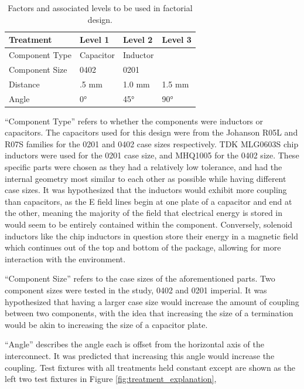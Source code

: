 \documentclass[12pt]{usfcoe}
\begin{document}
    \begin{table}[H]
        \begin{center}
            \begin{tabular}{|l|l|l|l|}
            \hline
            Treatment & Level 1 & Level 2 & Level 3\\
            \hline
            Component Type & Capacitor & Inductor & \\
            \hline
            Component Size & 0402 & 0201 & \\
            \hline
            Distance & .5 mm & 1.0 mm & 1.5 mm\\
            \hline
            Angle & 0° & 45° & 90°\\
            \hline
            \end{tabular}
        	\caption{Factors and associated levels to be used in factorial design.}
        \end{center}
        \label{tbl:treats}
	\end{table}   
	
    ``Component Type'' refers to whether the components were inductors or capacitors.
    The capacitors used for this design were from the Johanson R05L and R07S families for the 0201 and 0402 case sizes respectively.
    TDK MLG0603S chip inductors were used for the 0201 case size, and MHQ1005 for the 0402 size.
    These specific parts were chosen as they had a relatively low tolerance, and had the internal geometry most similar to each other as possible while having different case sizes.
    It was hypothesized that the inductors would exhibit more coupling than capacitors, as the E field lines begin at one plate of a capacitor and end at the other, meaning the majority of the field that electrical energy is stored in would seem to be entirely contained within the component.
    Conversely, solenoid inductors like the chip inductors in question store their energy in a magnetic field which continues out of the top and bottom of the package, allowing for more interaction with the environment. 
    
    ``Component Size'' refers to the case sizes of the aforementioned parts.
    Two component sizes were tested in the study, 0402 and 0201 imperial.
    It was hypothesized that having a larger case size would increase the amount of coupling between two components, with the idea that increasing the size of a termination would be akin to increasing the size of a capacitor plate.
    
    ``Angle'' describes the angle each is offset from the horizontal axis of the interconnect.
    It was predicted that increasing this angle would increase the coupling.
    Test fixtures with all treatments held constant except are shown as the left two test fixtures in Figure \ref{fig:treatment_explanation},
    
\end{document}
